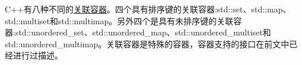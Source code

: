 
C++有八种不同的\href{http://en.cppreference.com/w/cpp/container}{关联容器}。四个具有排序键的关联容器:std::set、std::map、std::multiset和std::multimap。另外四个是具有未排序键的关联容器:std::unordered\_set、std::unordered\_map、std::unordered\_multiset和std::unordered\_multimap。关联容器是特殊的容器，容器支持的接口在前文中已经进行过描述。